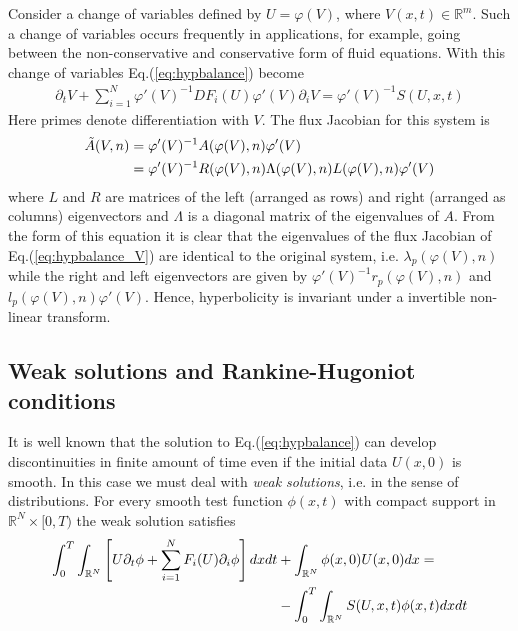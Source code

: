 \documentclass[11pt, reqno]{amsart}
\newcommand{\eqr}[1]{Eq.\thinspace(#1)}
\newcommand{\spfrac}[2]{{\partial_{#1}} {#2}}
\theoremstyle{definition}
\begin{document}
Consider a change of variables defined by $U=\varphi(V)$, where
$V(x,t) \in \mathbb{R}^m$. Such a change of variables occurs
frequently in applications, for example, going between the
non-conservative and conservative form of fluid equations. With this
change of variables \eqr{\ref{eq:hypbalance}} become
\begin{align}
  \spfrac{t}{V} + \sum_{i=1}^N 
  \varphi'(V)^{-1}
  DF_i(U)
  \varphi'(V)
  \spfrac{i}{V}
  = 
  \varphi'(V)^{-1}S(U,x,t)
  \label{eq:hypbalance_V}
\end{align}
Here primes denote differentiation with $V$. The flux Jacobian for
this system is
\begin{align}
  \tilde{A}(V,n) 
  &=
  \varphi'(V)^{-1} A(\varphi(V),n) \varphi'(V) \notag \\
  &=
  \varphi'(V)^{-1} R(\varphi(V),n) \Lambda(\varphi(V),n) L(\varphi(V),n) \varphi'(V)
\end{align}
where $L$ and $R$ are matrices of the left (arranged as rows) and
right (arranged as columns) eigenvectors and $\Lambda$ is a diagonal
matrix of the eigenvalues of $A$. From the form of this equation it is
clear that the eigenvalues of the flux Jacobian of
\eqr{\ref{eq:hypbalance_V}} are identical to the original system,
i.e. $\lambda_p(\varphi(V), n)$ while the right and left eigenvectors
are given by $\varphi'(V)^{-1} r_p(\varphi(V),n)$ and
$l_p(\varphi(V),n) \varphi'(V)$. Hence, hyperbolicity is invariant
under a invertible non-linear transform.

\subsection{Weak solutions and Rankine-Hugoniot conditions}

It is well known that the solution to \eqr{\ref{eq:hypbalance}} can
develop discontinuities in finite amount of time even if the initial
data $U(x,0)$ is smooth. In this case we must deal with \emph{weak
  solutions}, i.e. in the sense of distributions. For every smooth
test function $\phi(x,t)$ with compact support in
$\mathbb{R}^N\times[0,T)$ the weak solution satisfies
\begin{align}
  \int_0^T\int_{\mathbb{R}^N}
  \left[
    U\spfrac{t}{\phi}
    +
    \sum_{i=1}^N F_i(U)\spfrac{i}{\phi}
  \right]
  dx dt
  &+
  \int_{\mathbb{R}^N}
  \phi(x,0)U(x,0) dx
  = \notag \\
  &-
  \int_0^T\int_{\mathbb{R}^N}
  S(U,x,t)\phi(x,t)
  dx dt  
\end{align}
\end{document}
